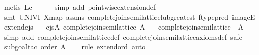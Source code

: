 \begin{isabellebody}
\ {}metis\ Lc{}\isanewline
\ \ \ \ \isamarkupfalse%
\ {}simp\ add{}\ pointwise{}extension{}def{}\isanewline
\ \ \ \ \isamarkupfalse%
\ {}smt\ UNIV{}I\ X{}map\ assms\ complete{}join{}semilattice{}lub{}greatest\ ftype{}pred\ imageE{}\isanewline
{}\isamarkupfalse%
%
\endisatagproof
{\isafoldproof}%
%
\isadelimproof
\isanewline
%
\endisadelimproof
\isanewline
{}\isamarkupfalse%
\ extend{}cjs{}\isanewline
\ \ \ cjs{}A{}\ {}complete{}join{}semilattice\ A{}\isanewline
\ \ \ {}complete{}join{}semilattice\ {}{}\ A{}{}\isanewline
%
\isadelimproof
\ \ %
\endisadelimproof
%
\isatagproof
{}\isamarkupfalse%
\ {}simp\ add{}\ complete{}join{}semilattice{}def\ complete{}join{}semilattice{}axioms{}def{}\ safe{}\isanewline
\ \ \isamarkupfalse%
\ {}subgoal{}tac\ {}order\ A{}{}\isanewline
\ \ \isamarkupfalse%
\ {}rule\ extend{}ord{}\ auto{}\isanewline

\end{isabellebody}
